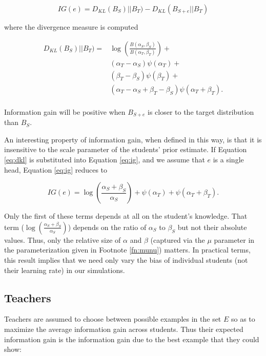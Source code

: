 \documentclass[10pt,letterpaper]{article}
\begin{document}
\begin{equation}
\label{eq:ig}
IG(e) = D_{KL} ( B_{S})||B_T )  - D_{KL} ( B_{S+e} ||B_T ) 
\end{equation}

\noindent where the divergence measure is computed

\begin{equation}
\label{eq:dkl}
\begin{split}
D_{KL} ( B_{S})||B_T )  = & \log( \frac{B(\alpha_{S},\beta_{S})}{B(\alpha_{T},\beta_{T})}) + \\
& (\alpha_T - \alpha_S) \psi (\alpha_T) + \\ 
& (\beta_T - \beta_S) \psi (\beta_T) + \\
& (\alpha_T - \alpha_S + \beta_T - \beta_S) \psi (\alpha_T + \beta_T). \\
\end{split}
\end{equation}

\noindent Information gain will be positive when $B_{S+e}$ is closer to the target distribution than $B_S$.

An interesting property of information gain, when defined in this way, is that it is insensitive to the scale parameter of the students' prior estimate. If Equation \ref{eq:dkl} is substituted into Equation \ref{eq:ig}, and we assume that $e$ is a single head, Equation \ref{eq:ig} reduces to

\begin{equation}
IG(e) = \log(\frac{\alpha_S + \beta_S}{\alpha_S}) + \psi (\alpha_T) + \psi (\alpha_T + \beta_T).
\end{equation}

\noindent Only the first of these terms depends at all on the student's knowledge. That term ($\log(\frac{\alpha_S + \beta_S}{\alpha_S})$) depends on the ratio of $\alpha_S$ to $\beta_S$ but not their absolute values. Thus, only the relative size of $\alpha$ and $\beta$ (captured via the $\mu$ parameter in the parameterization given in Footnote \ref{fn:munu}) matters. In practical terms, this result implies that we need only vary the bias of individual students (not their learning rate) in our simulations.

\subsection{Teachers}

Teachers are assumed to choose between possible examples in the set $E$ so as to maximize the average information gain across students. Thus their expected information gain is the information gain due to the best example that they could show:
\end{document}
